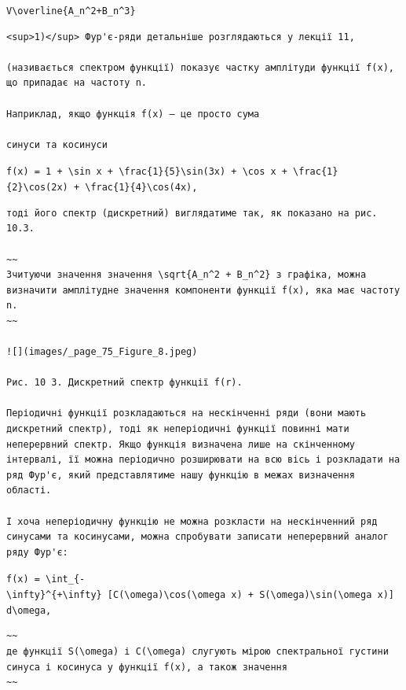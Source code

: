 \documentclass[
  ukrainian,
]{article}
\begin{document}
\texttt{V\textbackslash{}overline\{A\_n\^{}2+B\_n\^{}3\}}

\begin{verbatim}
<sup>1)</sup> Фур'є-ряди детальніше розглядаються у лекції 11,

(називається спектром функції) показує частку амплітуди функції f(x), що припадає на частоту n.

Наприклад, якщо функція f(x) — це просто сума

синуси та косинуси
\end{verbatim}

\texttt{f(x)\ =\ 1\ +\ \textbackslash{}sin\ x\ +\ \textbackslash{}frac\{1\}\{5\}\textbackslash{}sin(3x)\ +\ \textbackslash{}cos\ x\ +\ \textbackslash{}frac\{1\}\{2\}\textbackslash{}cos(2x)\ +\ \textbackslash{}frac\{1\}\{4\}\textbackslash{}cos(4x),}

\begin{verbatim}
тоді його спектр (дискретний) виглядатиме так, як показано на рис. 10.3.

~~
Зчитуючи значення значення \sqrt{A_n^2 + B_n^2} з графіка, можна визначити амплітудне значення компоненти функції f(x), яка має частоту n.
~~

![](images/_page_75_Figure_8.jpeg)

Рис. 10 3. Дискретний спектр функції f(r).

Періодичні функції розкладаються на нескінченні ряди (вони мають дискретний спектр), тоді як неперіодичні функції повинні мати неперервний спектр. Якщо функція визначена лише на скінченному інтервалі, її можна періодично розширювати на всю вісь і розкладати на ряд Фур'є, який представлятиме нашу функцію в межах визначення області.

І хоча неперіодичну функцію не можна розкласти на нескінченний ряд синусами та косинусами, можна спробувати записати неперервний аналог ряду Фур'є:
\end{verbatim}

\texttt{f(x)\ =\ \textbackslash{}int\_\{-\textbackslash{}infty\}\^{}\{+\textbackslash{}infty\}\ {[}C(\textbackslash{}omega)\textbackslash{}cos(\textbackslash{}omega\ x)\ +\ S(\textbackslash{}omega)\textbackslash{}sin(\textbackslash{}omega\ x){]}\ d\textbackslash{}omega,}

\begin{verbatim}
~~
де функції S(\omega) і C(\omega) слугують мірою спектральної густини синуса і косинуса у функції f(x), а також значення
~~
\end{verbatim}
\end{document}
